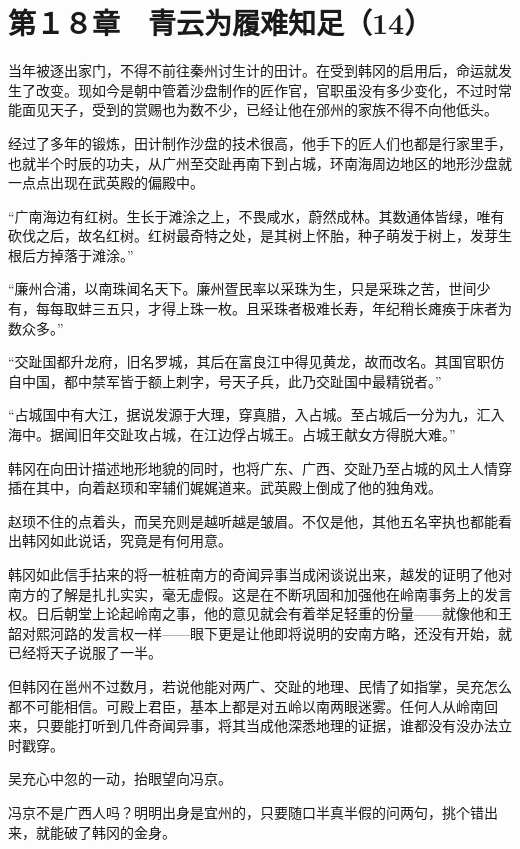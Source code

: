 \section{第１８章　青云为履难知足（14）}

当年被逐出家门，不得不前往秦州讨生计的田计。在受到韩冈的启用后，命运就发生了改变。现如今是朝中管着沙盘制作的匠作官，官职虽没有多少变化，不过时常能面见天子，受到的赏赐也为数不少，已经让他在邠州的家族不得不向他低头。

经过了多年的锻炼，田计制作沙盘的技术很高，他手下的匠人们也都是行家里手，也就半个时辰的功夫，从广州至交趾再南下到占城，环南海周边地区的地形沙盘就一点点出现在武英殿的偏殿中。

“广南海边有红树。生长于滩涂之上，不畏咸水，蔚然成林。其数通体皆绿，唯有砍伐之后，故名红树。红树最奇特之处，是其树上怀胎，种子萌发于树上，发芽生根后方掉落于滩涂。”

“廉州合浦，以南珠闻名天下。廉州疍民率以采珠为生，只是采珠之苦，世间少有，每每取蚌三五只，才得上珠一枚。且采珠者极难长寿，年纪稍长瘫痪于床者为数众多。”

“交趾国都升龙府，旧名罗城，其后在富良江中得见黄龙，故而改名。其国官职仿自中国，都中禁军皆于额上刺字，号天子兵，此乃交趾国中最精锐者。”

“占城国中有大江，据说发源于大理，穿真腊，入占城。至占城后一分为九，汇入海中。据闻旧年交趾攻占城，在江边俘占城王。占城王献女方得脱大难。”

韩冈在向田计描述地形地貌的同时，也将广东、广西、交趾乃至占城的风土人情穿插在其中，向着赵顼和宰辅们娓娓道来。武英殿上倒成了他的独角戏。

赵顼不住的点着头，而吴充则是越听越是皱眉。不仅是他，其他五名宰执也都能看出韩冈如此说话，究竟是有何用意。

韩冈如此信手拈来的将一桩桩南方的奇闻异事当成闲谈说出来，越发的证明了他对南方的了解是扎扎实实，毫无虚假。这是在不断巩固和加强他在岭南事务上的发言权。日后朝堂上论起岭南之事，他的意见就会有着举足轻重的份量——就像他和王韶对熙河路的发言权一样——眼下更是让他即将说明的安南方略，还没有开始，就已经将天子说服了一半。

但韩冈在邕州不过数月，若说他能对两广、交趾的地理、民情了如指掌，吴充怎么都不可能相信。可殿上君臣，基本上都是对五岭以南两眼迷雾。任何人从岭南回来，只要能打听到几件奇闻异事，将其当成他深悉地理的证据，谁都没有没办法立时戳穿。

吴充心中忽的一动，抬眼望向冯京。

冯京不是广西人吗？明明出身是宜州的，只要随口半真半假的问两句，挑个错出来，就能破了韩冈的金身。

